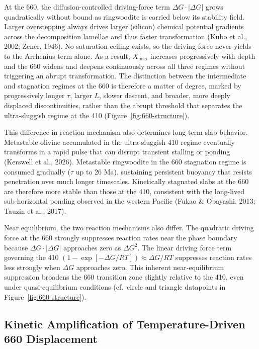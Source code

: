 \documentclass[draft,linenumbers]{agujournal2019}
\begin{document}
At the 660, the diffusion-controlled driving-force term
\(\Delta G \cdot |\Delta G|\) grows quadratically without bound as
ringwoodite is carried below its stability field. Larger overstepping
always drives larger (silicon) chemical potential gradients across the
decomposition lamellae and thus faster transformation (Kubo et al.,
2002; Zener, 1946). No saturation ceiling exists, so the driving force
never yields to the Arrhenius term alone. As a result,
\(\dot{X}_\mathrm{max}\) increases progressively with depth and the 660
widens and deepens continuously across all three regimes without
triggering an abrupt transformation. The distinction between the
intermediate and stagnation regimes at the 660 is therefore a matter of
degree, marked by progressively longer \(\tau\), larger \(L\), slower
descent, and broader, more deeply displaced discontinuities, rather than
the abrupt threshold that separates the ultra-sluggish regime at the 410
(Figure~\ref{fig:660-structure}).

This difference in reaction mechanism also determines long-term slab
behavior. Metastable olivine accumulated in the ultra-sluggish 410
regime eventually transforms in a rapid pulse that can disrupt transient
stalling or ponding (Kerswell et al., 2026). Metastable ringwoodite in
the 660 stagnation regime is consumed gradually (\(\tau\) up to 26 Ma),
sustaining persistent buoyancy that resists penetration over much longer
timescales. Kinetically stagnated slabs at the 660 are therefore more
stable than those at the 410, consistent with the long-lived
sub-horizontal ponding observed in the western Pacific (Fukao \&
Obayashi, 2013; Tauzin et al., 2017).

Near equilibrium, the two reaction mechanisms also differ. The quadratic
driving force at the 660 strongly suppresses reaction rates near the
phase boundary because \(\Delta G \cdot |\Delta G|\) approaches zero as
\(\Delta G^2\). The linear driving force term governing the 410
\((1 - \exp[-\Delta G / RT]) \approx \Delta G / RT\) suppresses reaction
rates less strongly when \(\Delta G\) approaches zero. This inherent
near-equilibrium suppression broadens the 660 transition zone slightly
relative to the 410, even under quasi-equilibrium conditions (cf.~circle
and triangle datapoints in Figure~\ref{fig:660-structure}).

\subsection{Kinetic Amplification of Temperature-Driven 660
Displacement}\label{sec:kinetic-amplification-of-temperature-driven-660-displacement}
\end{document}
